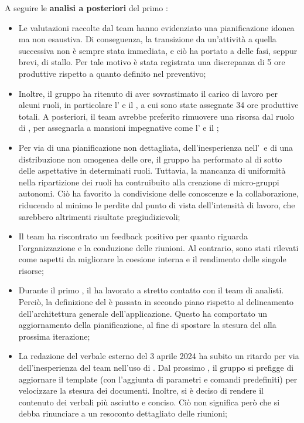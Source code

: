 \vspace{0.5\baselineskip}
\par A seguire le \textbf{analisi a posteriori} del primo :
\begin{itemize}
  \item Le valutazioni raccolte dal team hanno evidenziato una pianificazione idonea ma non esaustiva. Di conseguenza, la transizione da un'attività a quella successiva non è sempre stata immediata, e ciò ha portato a delle fasi, seppur brevi, di stallo. Per tale motivo è stata registrata una discrepanza di 5 ore produttive rispetto a quanto definito nel preventivo;
  \item Inoltre, il gruppo ha ritenuto di aver sovrastimato il carico di lavoro per alcuni ruoli, in particolare l'\Analista{} e il \Progettista{}, a cui sono state assegnate 34 ore produttive totali. A posteriori, il team avrebbe preferito rimuovere una risorsa dal ruolo di \Analista{}, per assegnarla a mansioni impegnative come l'\Amministratore{} e il \Responsabile{};
  \item Per via di una pianificazione non dettagliata, dell'inesperienza nell'\AdR\ e di una distribuzione non omogenea delle ore, il gruppo ha performato al di sotto delle aspettative in determinati ruoli. Tuttavia, la mancanza di uniformità nella ripartizione dei ruoli ha contruibuito alla creazione di micro-gruppi autonomi. Ciò ha favorito la condivisione delle conoscenze e la collaborazione, riducendo al minimo le perdite dal punto di vista dell'intensità di lavoro, che sarebbero altrimenti risultate pregiudizievoli;
  \item Il team ha riscontrato un feedback positivo per quanto riguarda l'organizzazione e la conduzione delle riunioni. Al contrario, sono stati rilevati come aspetti da migliorare la coesione interna e il rendimento delle singole risorse;
  \item Durante il primo , il \Progettista{} ha lavorato a stretto contatto con il team di analisti. Perciò, la definizione del  è passata in secondo piano rispetto al delineamento dell'architettura generale dell'applicazione. Questo ha comportato un aggiornamento della pianificazione, al fine di spostare la stesura del  alla prossima iterazione;
  \item La redazione del verbale esterno del 3 aprile 2024 ha subito un ritardo per via dell'inesperienza del team nell'uso di . Dal prossimo , il gruppo si prefigge di aggiornare il template  (con l'aggiunta di parametri e comandi predefiniti) per velocizzare la stesura dei documenti. Inoltre, si è deciso di rendere il contenuto dei verbali più asciutto e conciso. Ciò non significa però che si debba rinunciare a un resoconto dettagliato delle riunioni;

\end{itemize}
